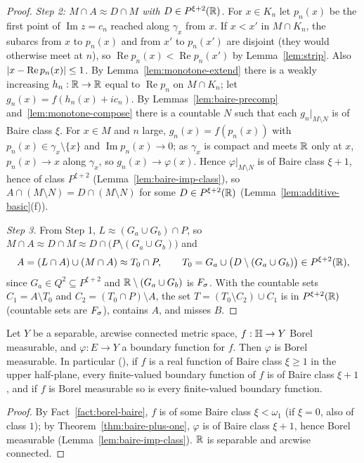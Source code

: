 \begin{proof}
\emph{Step 2: $M\cap A\approx D\cap M$ with $D\in P^{\xi+2}(\mathbb{R})$.} For $x\in K_n$ let $p_n(x)$ be the first point of
$\operatorname{Im}z=c_n$ reached along $\gamma_x$ from $x$. If $x<x'$ in $M\cap K_n$, the subarcs from $x$ to $p_n(x)$ and from
$x'$ to $p_n(x')$ are disjoint (they would otherwise meet at $n$), so $\operatorname{Re}p_n(x)<\operatorname{Re}p_n(x')$ by
Lemma~\ref{lem:strip}. Also $\lvert x-\operatorname{Re}p_n(x)\rvert\le1$. By Lemma~\ref{lem:monotone-extend} there is a weakly increasing
$h_n:\mathbb{R}\to\mathbb{R}$ equal to $\operatorname{Re}p_n$ on $M\cap K_n$; let $g_n(x)=f(h_n(x)+ic_n)$. By Lemmas~\ref{lem:baire-precomp}
and~\ref{lem:monotone-compose} there is a countable $N$ such that each $g_n|_{M\setminus N}$ is of Baire class $\xi$. For
$x\in M$ and $n$ large, $g_n(x)=f(p_n(x))$ with $p_n(x)\in\gamma_x\setminus\{x\}$ and $\operatorname{Im}p_n(x)\to0$; as $\gamma_x$
is compact and meets $\mathbb{R}$ only at $x$, $p_n(x)\to x$ along $\gamma_x$, so $g_n(x)\to\varphi(x)$. Hence $\varphi|_{M\setminus N}$ is
of Baire class $\xi+1$, hence of class $P^{\xi+2}$ (Lemma~\ref{lem:baire-imp-class}), so $A\cap(M\setminus N)=D\cap(M\setminus N)$
for some $D\in P^{\xi+2}(\mathbb{R})$ (Lemma~\ref{lem:additive-basic}(f)).

\emph{Step 3.} From Step 1, $L\approx(G_a\cup G_b)\cap P$, so
$M\cap A\approx D\cap M\approx D\cap\bigl(P\setminus(G_a\cup G_b)\bigr)$ and
\[
A=(L\cap A)\cup(M\cap A)\approx T_0\cap P,\qquad T_0=G_a\cup\bigl(D\setminus(G_a\cup G_b)\bigr)\in P^{\xi+2}(\mathbb{R}),
\]
since $G_a\in Q^2\subseteq P^{\xi+2}$ and $\mathbb{R}\setminus(G_a\cup G_b)$ is $F_\sigma$. With the countable sets
$C_1=A\setminus T_0$ and $C_2=(T_0\cap P)\setminus A$, the set $T=(T_0\setminus C_2)\cup C_1$ is in $P^{\xi+2}(\mathbb{R})$ (countable sets
are $F_\sigma$), contains $A$, and misses $B$.
\end{proof}

\begin{corollary}\label{cor:borel}
Let $Y$ be a separable, arcwise connected metric space, $f:\mathbb{H}\to Y$ Borel measurable, and $\varphi:E\to Y$ a boundary function for $f$.
Then $\varphi$ is Borel measurable. In particular (\cite[Theorems 4, 5]{JMM}), if $f$ is a real function of Baire class
$\xi\ge1$ in the upper half-plane, every finite-valued boundary function of $f$ is of Baire class $\xi+1$, and if $f$ is
Borel measurable so is every finite-valued boundary function.
\end{corollary}
\begin{proof}
By Fact~\ref{fact:borel-baire}, $f$ is of some Baire class $\xi<\omega_1$ (if $\xi=0$, also of class $1$); by
Theorem~\ref{thm:baire-plus-one}, $\varphi$ is of Baire class $\xi+1$, hence Borel measurable
(Lemma~\ref{lem:baire-imp-class}). $\mathbb{R}$ is separable and arcwise connected.
\end{proof}

